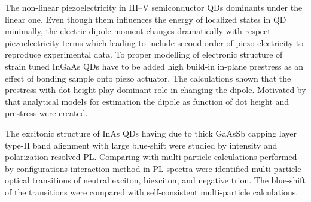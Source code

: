 \documentclass[
a4paper, %
11pt, %
onecolumn, %
openany, %
oldfontcommands,
]{memoir}
\begin{document}
The non-linear piezoelectricity in III--V semiconductor QDs dominants under the linear one. Even though them influences the energy of localized states in QD minimally, the electric dipole moment changes dramatically with respect piezoelectricity terms which leading to include second-order of piezo-electricity to reproduce experimental data. To proper modelling of electronic structure of strain tuned InGaAs QDs have to be added high build-in in-plane prestress as an effect of bonding sample onto piezo actuator. The calculations shown that the prestress with dot height play dominant role in changing the dipole. Motivated by that analytical models for estimation the dipole as function of dot height and prestress were created.

The excitonic structure of InAs QDs having due to thick GaAsSb capping layer type-II band alignment with large blue-shift were studied by intensity and polarization resolved PL. Comparing with multi-particle calculations performed by configurations interaction method in PL spectra were identified multi-particle optical transitions of neutral exciton, biexciton, and negative trion. The blue-shift of the transitions were compared with self-consistent multi-particle calculations.

\end{document}
